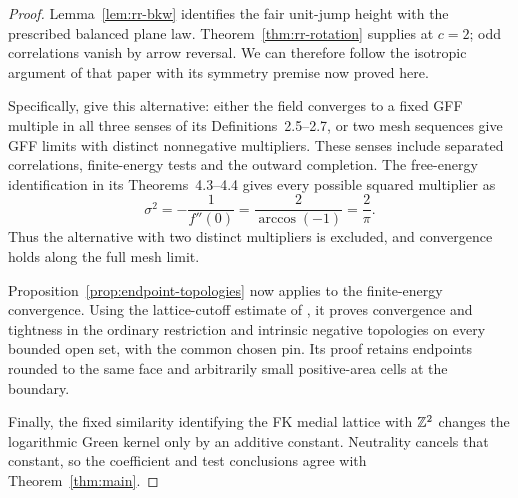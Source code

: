 \begin{proof}
Lemma~\ref{lem:rr-bkw} identifies the fair unit-jump height with the
prescribed balanced plane law. Theorem~\ref{thm:rr-rotation} supplies
\cite[Theorem~4.1]{DKLM2026} at $c=2$; odd correlations vanish by
arrow reversal. We can therefore follow the isotropic argument of
that paper with its symmetry premise now proved here.

Specifically, \cite[Theorems~6.1, 7.1 and~8.1]{DKLM2026} give this
alternative: either the field converges to a fixed GFF multiple in all
three senses of its Definitions~2.5--2.7, or two mesh sequences give
GFF limits with distinct nonnegative multipliers. These senses include
separated correlations, finite-energy tests and the outward completion.
The free-energy identification in its Theorems~4.3--4.4 gives every
possible squared multiplier as
\[
 \sigma^2=-\frac1{f''(0)}
          =\frac2{\arccos(-1)}=\frac2\pi.
\]
Thus the alternative with two distinct multipliers is excluded, and
convergence holds along the full mesh limit.

Proposition~\ref{prop:endpoint-topologies} now applies to the
finite-energy convergence. Using the lattice-cutoff estimate of
\cite[Theorem~4.5]{DKLM2026}, it proves convergence and tightness
in the ordinary restriction and intrinsic negative topologies on
every bounded open set, with the common chosen pin. Its proof
retains endpoints rounded to the same face and arbitrarily small
positive-area cells at the boundary.

Finally, the fixed similarity identifying the FK medial lattice
with $\mathbb Z^2$ changes the logarithmic Green kernel only by an
additive constant. Neutrality cancels that constant, so the
coefficient and test conclusions agree with Theorem~\ref{thm:main}.
\end{proof}
